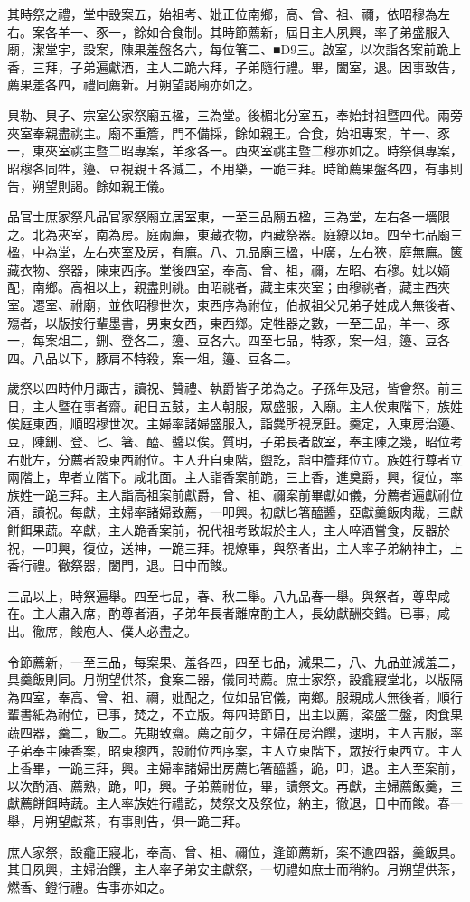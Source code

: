 \begin{pinyinscope}
其時祭之禮，堂中設案五，始祖考、妣正位南鄉，高、曾、祖、禰，依昭穆為左右。案各羊一、豕一，餘如合食制。其時節薦新，屆日主人夙興，率子弟盛服入廟，潔堂宇，設案，陳果羞盤各六，每位箸二、■D9三。啟室，以次詣各案前跪上香，三拜，子弟遍獻酒，主人二跪六拜，子弟隨行禮。畢，闔室，退。因事致告，薦果羞各四，禮同薦新。月朔望謁廟亦如之。

貝勒、貝子、宗室公家祭廟五楹，三為堂。後楣北分室五，奉始封祖暨四代。兩旁夾室奉親盡祧主。廟不重簷，門不備採，餘如親王。合食，始祖專案，羊一、豕一，東夾室祧主暨二昭專案，羊豕各一。西夾室祧主暨二穆亦如之。時祭俱專案，昭穆各同牲，籩、豆視親王各減二，不用樂，一跪三拜。時節薦果盤各四，有事則告，朔望則謁。餘如親王儀。

品官士庶家祭凡品官家祭廟立居室東，一至三品廟五楹，三為堂，左右各一墻限之。北為夾室，南為房。庭兩廡，東藏衣物，西藏祭器。庭繚以垣。四至七品廟三楹，中為堂，左右夾室及房，有廡。八、九品廟三楹，中廣，左右狹，庭無廡。篋藏衣物、祭器，陳東西序。堂後四室，奉高、曾、祖，禰，左昭、右穆。妣以嫡配，南鄉。高祖以上，親盡則祧。由昭祧者，藏主東夾室；由穆祧者，藏主西夾室。遷室、祔廟，並依昭穆世次，東西序為祔位，伯叔祖父兄弟子姓成人無後者、殤者，以版按行輩墨書，男東女西，東西鄉。定牲器之數，一至三品，羊一、豕一，每案俎二，鉶、登各二，籩、豆各六。四至七品，特豕，案一俎，籩、豆各四。八品以下，豚肩不特殺，案一俎，籩、豆各二。

歲祭以四時仲月諏吉，讀祝、贊禮、執爵皆子弟為之。子孫年及冠，皆會祭。前三日，主人暨在事者齋。祀日五鼓，主人朝服，眾盛服，入廟。主人俟東階下，族姓俟庭東西，順昭穆世次。主婦率諸婦盛服入，詣爨所視烹飪。羹定，入東房治籩、豆，陳鉶、登、匕、箸、醯、醬以俟。質明，子弟長者啟室，奉主陳之幾，昭位考右妣左，分薦者設東西祔位。主人升自東階，盥訖，詣中簷拜位立。族姓行尊者立兩階上，卑者立階下。咸北面。主人詣香案前跪，三上香，進奠爵，興，復位，率族姓一跪三拜。主人詣高祖案前獻爵，曾、祖、禰案前畢獻如儀，分薦者遍獻祔位酒，讀祝。每獻，主婦率諸婦致薦，一叩興。初獻匕箸醯醬，亞獻羹飯肉胾，三獻餅餌果蔬。卒獻，主人跪香案前，祝代祖考致嘏於主人，主人啐酒嘗食，反器於祝，一叩興，復位，送神，一跪三拜。視燎畢，與祭者出，主人率子弟納神主，上香行禮。徹祭器，闔門，退。日中而餕。

三品以上，時祭遍舉。四至七品，春、秋二舉。八九品春一舉。與祭者，尊卑咸在。主人肅入席，酌尊者酒，子弟年長者離席酌主人，長幼獻酬交錯。已事，咸出。徹席，餕庖人、僕人必盡之。

令節薦新，一至三品，每案果、羞各四，四至七品，減果二，八、九品並減羞二，具羹飯則同。月朔望供茶，食案二器，儀同時薦。庶士家祭，設龕寢堂北，以版隔為四室，奉高、曾、祖、禰，妣配之，位如品官儀，南鄉。服親成人無後者，順行輩書紙為祔位，已事，焚之，不立版。每四時節日，出主以薦，粢盛二盤，肉食果蔬四器，羹二，飯二。先期致齋。薦之前夕，主婦在房治饌，逮明，主人吉服，率子弟奉主陳香案，昭東穆西，設祔位西序案，主人立東階下，眾按行東西立。主人上香畢，一跪三拜，興。主婦率諸婦出房薦匕箸醯醬，跪，叩，退。主人至案前，以次酌酒、薦熟，跪，叩，興。子弟薦祔位，畢，讀祭文。再獻，主婦薦飯羹，三獻薦餅餌時蔬。主人率族姓行禮訖，焚祭文及祭位，納主，徹退，日中而餕。春一舉，月朔望獻茶，有事則告，俱一跪三拜。

庶人家祭，設龕正寢北，奉高、曾、祖、禰位，逢節薦新，案不逾四器，羹飯具。其日夙興，主婦治饌，主人率子弟安主獻祭，一切禮如庶士而稍約。月朔望供茶，燃香、鐙行禮。告事亦如之。


\end{pinyinscope}